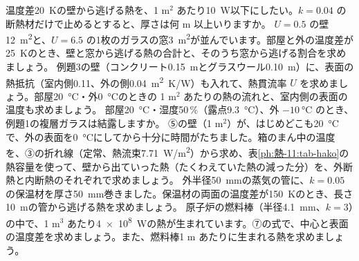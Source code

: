 \bkendproblems
{}
\bkproblem 温度差\qty{20}{K}の壁から逃げる熱を、1 m$^2$ あたり\qty{10}{W}以下にしたい。$k=0.04$ の断熱材だけで止めるとすると、厚さは何 m 以上いりますか。
\bkproblem $U=0.5$ の壁\qty{12}{m^2}と、$U=6.5$ の1枚のガラスの窓\qty{3}{m^2}が並んでいます。部屋と外の温度差が\qty{25}{K}のとき、壁と窓から逃げる熱の合計と、そのうち窓から逃げる割合を求めましょう。
\bkproblem 例題3の壁（コンクリート\qty{0.15}{m}とグラスウール\qty{0.10}{m}）に、表面の熱抵抗（室内側0.11、外の側\qty{0.04}{m^2.K/W}）も入れて、熱貫流率 $U$ を求めましょう。部屋\qty{20}{\celsius}・外\qty{0}{\celsius}のときの 1 m$^2$ あたりの熱の流れと、室内側の表面の温度も求めましょう。
\bkproblem 部屋\qty{20}{\celsius}・湿度50\,\%（露点\qty{9.3}{\celsius}）、外 $\qty{-10}{\celsius}$ のとき、例題1の複層ガラスは結露しますか。
\bkproblem ⑤の壁（1 m$^2$）が、はじめどこも\qty{20}{\celsius}で、外の表面を\qty{0}{\celsius}にしてから十分に時間がたちました。箱のまん中の温度を、③の折れ線（定常、熱流束\qty{7.71}{W/m^2}）から求め、表\ref{ph:熱-11:tab-hako}の熱容量を使って、壁から出ていった熱（たくわえていた熱の減った分）を、外断熱と内断熱のそれぞれで求めましょう。
\bkproblem 外半径\qty{50}{mm}の蒸気の管に、$k=0.05$ の保温材を厚さ\qty{50}{mm}巻きました。保温材の両面の温度差が\qty{150}{K}のとき、長さ\qty{10}{m}の管から逃げる熱を求めましょう。
\bkproblem 原子炉の燃料棒（半径\qty{4.1}{mm}、$k=3$）の中で、1 m$^3$ あたり\qty{4e8}{W}の熱が生まれています。⑦の式で、中心と表面の温度差を求めましょう。また、燃料棒1 m あたりに生まれる熱を求めましょう。
